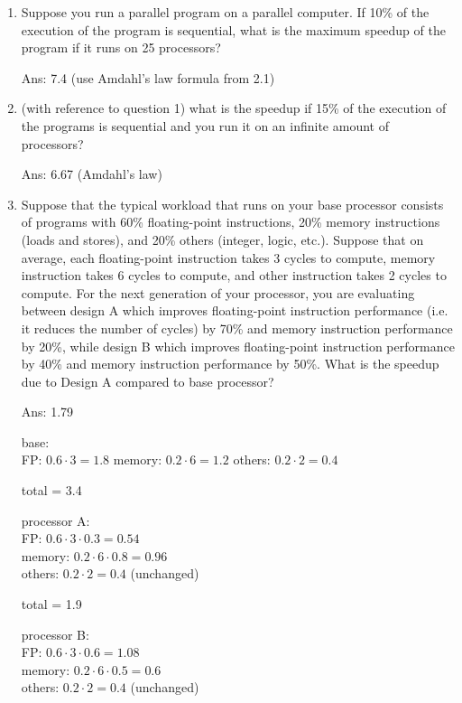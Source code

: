 \documentclass[12pt]{article}
\begin{document}
    \begin{enumerate}
        \item Suppose you run a parallel program on a parallel computer. If 10\% of the execution of the program is 
        sequential, what is the maximum speedup of the program if it runs on 25 processors?

        Ans: 7.4 (use Amdahl's law formula from 2.1)

        \item (with reference to question 1) what is the speedup if 15\% of the execution of the programs is sequential 
        and you run it on an infinite amount of processors?

        Ans: 6.67 (Amdahl's law)

        \item Suppose that the typical workload that runs on your base processor consists of programs with 60\% 
        floating-point instructions, 20\% memory instructions (loads and stores), and 20\% others (integer, logic, etc.). 
        Suppose that on average, each floating-point instruction takes 3 cycles to compute, memory instruction takes 6 
        cycles to compute, and other instruction takes 2 cycles to compute. For the next generation of your processor, 
        you are evaluating between design A which improves floating-point instruction performance (i.e. it reduces the 
        number of cycles) by 70\% and memory instruction performance by 20\%, while design B which improves floating-point 
        instruction performance by 40\% and memory instruction performance by 50\%. What is the speedup due to Design A 
        compared to base processor?

        Ans: 1.79

        base:\\
        FP: $0.6 \cdot 3 = 1.8$
        memory: $0.2 \cdot 6 = 1.2$
        others: $0.2 \cdot 2 = 0.4$

        total = 3.4

        processor A:\\
        FP: $0.6 \cdot 3 \cdot 0.3 = 0.54$\\
        memory: $0.2 \cdot 6 \cdot 0.8 = 0.96$\\
        others: $0.2 \cdot 2 = 0.4$ (unchanged)

        total = 1.9

        processor B:\\
        FP: $0.6 \cdot 3 \cdot 0.6 = 1.08$\\
        memory: $0.2 \cdot 6 \cdot 0.5 = 0.6$\\
        others: $0.2 \cdot 2 = 0.4$ (unchanged)


\end{enumerate}
\end{document}
